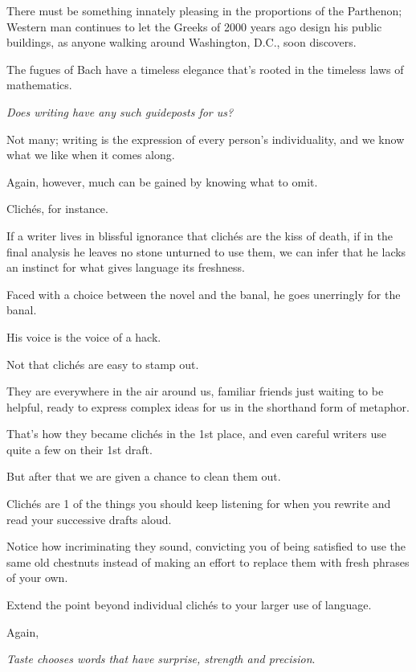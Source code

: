 \documentclass{book}
\numberwithin{equation}{section}
\begin{document}
There must be something innately pleasing in the proportions of the Parthenon; Western man continues to let the Greeks of 2000 years ago design his public buildings, as anyone walking around Washington, D.C., soon discovers.

The fugues of Bach have a timeless elegance that's rooted in the timeless laws of mathematics.

%
\textit{Does writing have any such guideposts for us?}

Not many; writing is the expression of every person's individuality, and we know what we like when it comes along.

Again, however, much can be gained by knowing what to omit.

Clich\'es, for instance.

If a writer lives in blissful ignorance that clich\'es are the kiss of death, if in the final analysis he leaves no stone unturned to use them, we can infer that he lacks an instinct for what gives language its freshness.

Faced with a choice between the novel and the banal, he goes unerringly for the banal.

His voice is the voice of a hack.

%
Not that clich\'es are easy to stamp out.

They are everywhere in the air around us, familiar friends just waiting to be helpful, ready to express complex ideas for us in the shorthand form of metaphor.

That's how they became clich\'es in the 1st place, and even careful writers use quite a few on their 1st draft.

But after that we are given a chance to clean them out.

Clich\'es are 1 of the things you should keep listening for when you rewrite and read your successive drafts aloud.

Notice how incriminating they sound, convicting you of being satisfied to use the same old chestnuts instead of making an effort to replace them with fresh phrases of your own.


%
Extend the point beyond individual clich\'es to your larger use of language.

Again, 

\textit{Taste chooses words that have surprise, strength and precision}.
\end{document}
